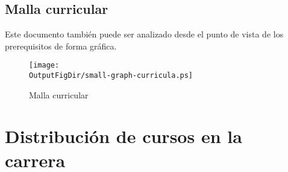 % 

\begin{landscape}

\end{landscape}

\begin{landscape}
\section{Malla curricular}\label{sec:vision-grafica}
\vspace{-0.3cm}Este documento también puede ser analizado desde el punto de vista de los prerequisitos de forma gráfica.
\begin{figure}[h!]
      \texttt{[image: \\OutputFigDir/small-graph-curricula.ps]}
      \label{fig:malla-curricular}
      \caption{Malla curricular \SchoolFullName}
\end{figure}
\end{landscape}

\section{Distribución de cursos en la carrera}

% 
% 
% 
% 
